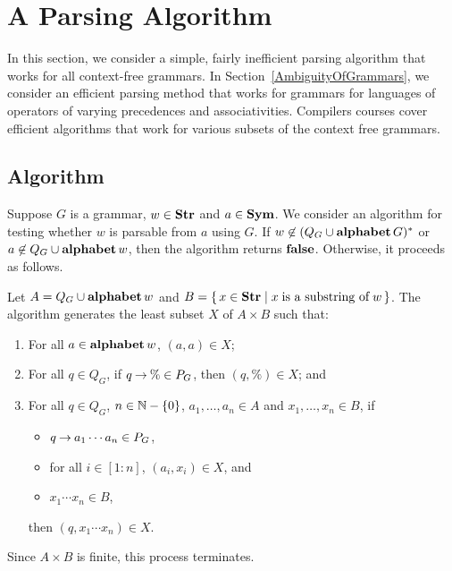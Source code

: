 \section{A Parsing Algorithm}
\label{AParsingAlgorithm}

In this section, we consider a simple, fairly inefficient parsing
algorithm that works for all context-free grammars.  In
Section~\ref{AmbiguityOfGrammars}, we consider an efficient parsing
method that works for grammars for languages of operators of varying
precedences and associativities.  Compilers courses cover efficient
algorithms that work for various subsets of the context free grammars.

\subsection{Algorithm}

Suppose $G$ is a grammar, $w\in\mathbf{Str}$ and $a\in\mathbf{Sym}$.  We consider an
algorithm for testing whether $w$ is parsable from $a$ using $G$.
If $w\not\in(Q_G\cup\mathbf{alphabet}\,G)^*$ or $a\not\in Q_G\cup\mathbf{alphabet}\,w$,
then the algorithm returns $\mathbf{false}$.
Otherwise, it proceeds as follows.

Let $A=Q_G\cup\mathbf{alphabet}\,w$ and $B=\{ \, x\in\mathbf{Str} \mid x\;\allowbreak\mbox{is a substring
of}\allowbreak\;w \, \}$.
The algorithm generates the least subset $X$ of $A\times B$ such that:
\begin{enumerate}[\quad(1)]
\item For all $a\in\mathbf{alphabet}\,w$, $(a,a)\in X$;

\item For all $q\in Q_G$, if $q\mathbin{\to}\%\in P_G$, then
  $(q,\%)\in X$; and

\item For all $q\in Q_G$, $n\in\mathbb{N}-\{0\}$, $a_1,\ldots,a_n\in A$ and
  $x_1,\ldots,x_n\in B$, if
  \begin{itemize}
  \item $q\mathbin{\to} a_1\cdots a_n\in P_G$,

  \item for all $i\in[1:n]$, $(a_i,x_i)\in X$, and

  \item $x_1\cdots x_n\in B$,
  \end{itemize}
then $(q,x_1\cdots x_n)\in X$.
\end{enumerate}
Since $A\times B$ is finite, this process terminates.

